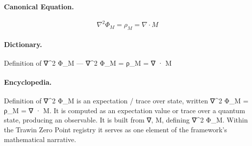 \paragraph{Canonical Equation.}
\[
\nabla^2 \Phi_M = \rho_M = \nabla \cdot M
\]

\paragraph{Dictionary.}
Definition of ∇\textasciicircum{}2 Φ\_M — ∇\textasciicircum{}2 Φ\_M = ρ\_M = ∇ · M

\paragraph{Encyclopedia.}
Definition of ∇\textasciicircum{}2 Φ\_M is an expectation / trace over state, written ∇\textasciicircum{}2 Φ\_M = ρ\_M = ∇ · M. It is computed as an expectation value or trace over a quantum state, producing an observable. It is built from ∇, M, defining ∇\textasciicircum{}2 Φ\_M. Within the Trawin Zero Point registry it serves as one element of the framework's mathematical narrative.
